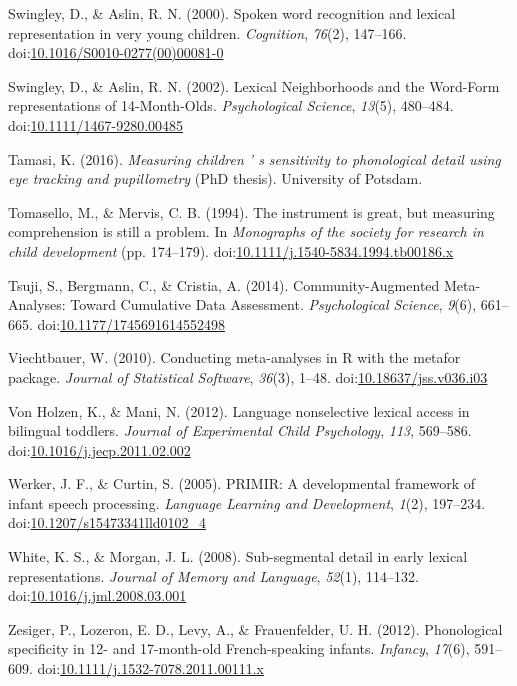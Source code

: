 \documentclass[man]{apa6}
\begin{document}
\leavevmode\hypertarget{ref-Swingley2000}{}%
Swingley, D., \& Aslin, R. N. (2000). Spoken word recognition and lexical representation in very young children. \emph{Cognition}, \emph{76}(2), 147--166. doi:\href{https://doi.org/10.1016/S0010-0277(00)00081-0}{10.1016/S0010-0277(00)00081-0}

\leavevmode\hypertarget{ref-Swingley2002}{}%
Swingley, D., \& Aslin, R. N. (2002). Lexical Neighborhoods and the Word-Form representations of 14-Month-Olds. \emph{Psychological Science}, \emph{13}(5), 480--484. doi:\href{https://doi.org/10.1111/1467-9280.00485}{10.1111/1467-9280.00485}

\leavevmode\hypertarget{ref-Tamasi2016}{}%
Tamasi, K. (2016). \emph{Measuring children ' s sensitivity to phonological detail using eye tracking and pupillometry} (PhD thesis). University of Potsdam.

\leavevmode\hypertarget{ref-Tomasello1994}{}%
Tomasello, M., \& Mervis, C. B. (1994). The instrument is great, but measuring comprehension is still a problem. In \emph{Monographs of the society for research in child development} (pp. 174--179). doi:\href{https://doi.org/10.1111/j.1540-5834.1994.tb00186.x}{10.1111/j.1540-5834.1994.tb00186.x}

\leavevmode\hypertarget{ref-Tsuji2014}{}%
Tsuji, S., Bergmann, C., \& Cristia, A. (2014). Community-Augmented Meta-Analyses: Toward Cumulative Data Assessment. \emph{Psychological Science}, \emph{9}(6), 661--665. doi:\href{https://doi.org/10.1177/1745691614552498}{10.1177/1745691614552498}

\leavevmode\hypertarget{ref-metafor}{}%
Viechtbauer, W. (2010). Conducting meta-analyses in R with the metafor package. \emph{Journal of Statistical Software}, \emph{36}(3), 1--48. doi:\href{https://doi.org/10.18637/jss.v036.i03}{10.18637/jss.v036.i03}

\leavevmode\hypertarget{ref-VonHolzen2012}{}%
Von Holzen, K., \& Mani, N. (2012). Language nonselective lexical access in bilingual toddlers. \emph{Journal of Experimental Child Psychology}, \emph{113}, 569--586. doi:\href{https://doi.org/10.1016/j.jecp.2011.02.002}{10.1016/j.jecp.2011.02.002}

\leavevmode\hypertarget{ref-Werker2005}{}%
Werker, J. F., \& Curtin, S. (2005). PRIMIR: A developmental framework of infant speech processing. \emph{Language Learning and Development}, \emph{1}(2), 197--234. doi:\href{https://doi.org/10.1207/s15473341lld0102_4}{10.1207/s15473341lld0102\_4}

\leavevmode\hypertarget{ref-White2008}{}%
White, K. S., \& Morgan, J. L. (2008). Sub-segmental detail in early lexical representations. \emph{Journal of Memory and Language}, \emph{52}(1), 114--132. doi:\href{https://doi.org/10.1016/j.jml.2008.03.001}{10.1016/j.jml.2008.03.001}

\leavevmode\hypertarget{ref-Zesiger2012}{}%
Zesiger, P., Lozeron, E. D., Levy, A., \& Frauenfelder, U. H. (2012). Phonological specificity in 12- and 17-month-old French-speaking infants. \emph{Infancy}, \emph{17}(6), 591--609. doi:\href{https://doi.org/10.1111/j.1532-7078.2011.00111.x}{10.1111/j.1532-7078.2011.00111.x}

\endgroup
\end{document}
